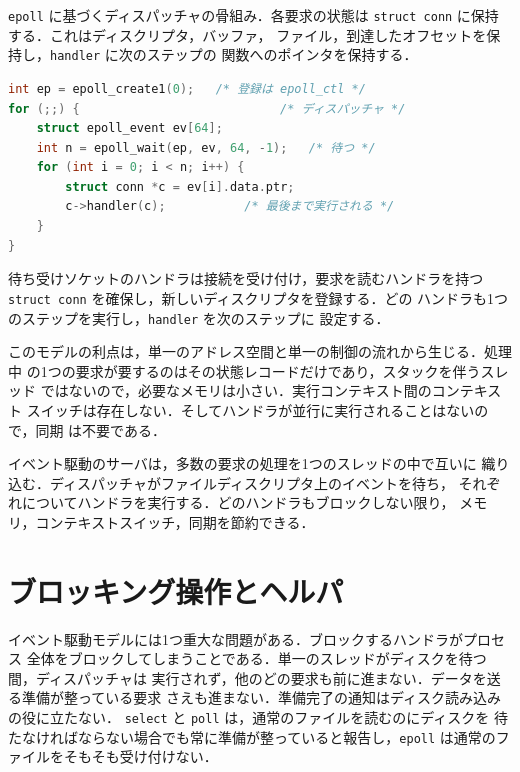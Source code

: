 \documentclass[../main.tex]{subfiles}
\begin{document}
\begin{example}
  \texttt{epoll} に基づくディスパッチャの骨組み．各要求の状態は
  \texttt{struct conn} に保持する．これはディスクリプタ，バッファ，
  ファイル，到達したオフセットを保持し，\texttt{handler} に次のステップの
  関数へのポインタを保持する．
  \begin{lstlisting}[language=C, numbers=none]
int ep = epoll_create1(0);   /* 登録は epoll_ctl */
for (;;) {                            /* ディスパッチャ */
    struct epoll_event ev[64];
    int n = epoll_wait(ep, ev, 64, -1);   /* 待つ */
    for (int i = 0; i < n; i++) {
        struct conn *c = ev[i].data.ptr;
        c->handler(c);           /* 最後まで実行される */
    }
}
\end{lstlisting}
  待ち受けソケットのハンドラは接続を受け付け，要求を読むハンドラを持つ
  \texttt{struct conn} を確保し，新しいディスクリプタを登録する．どの
  ハンドラも1つのステップを実行し，\texttt{handler} を次のステップに
  設定する．%
\end{example}

このモデルの利点は，単一のアドレス空間と単一の制御の流れから生じる．処理中
の1つの要求が要するのはその状態レコードだけであり，スタックを伴うスレッド
ではないので，必要なメモリは小さい．実行コンテキスト間のコンテキスト
スイッチは存在しない．そしてハンドラが並行に実行されることはないので，同期
は不要である．

\begin{keypoint}
  イベント駆動のサーバは，多数の要求の処理を1つのスレッドの中で互いに
  織り込む．ディスパッチャがファイルディスクリプタ上のイベントを待ち，
  それぞれについてハンドラを実行する．どのハンドラもブロックしない限り，
  メモリ，コンテキストスイッチ，同期を節約できる．
\end{keypoint}

\section{ブロッキング操作とヘルパ}
\label{sec:l06-helpers}

イベント駆動モデルには1つ重大な問題がある．ブロックするハンドラがプロセス
全体をブロックしてしまうことである．単一のスレッドがディスクを待つ間，ディスパッチャは
実行されず，他のどの要求も前に進まない．データを送る準備が整っている要求
さえも進まない．準備完了の通知はディスク読み込みの役に立たない．
\texttt{select} と \texttt{poll} は，通常のファイルを読むのにディスクを
待たなければならない場合でも常に準備が整っていると報告し，\texttt{epoll}
は通常のファイルをそもそも受け付けない．
\end{document}
